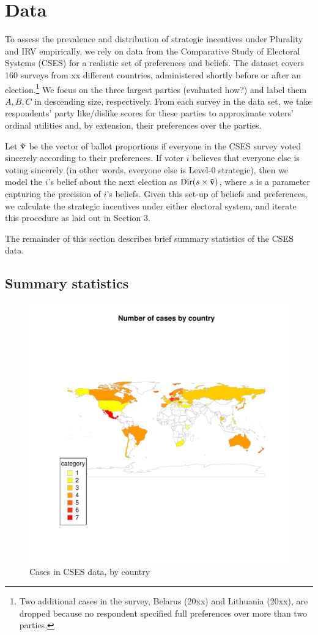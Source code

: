 \documentclass[11pt,a4paper]{article}
\begin{document}

\section{Data}

To assess the prevalence and distribution of strategic incentives under Plurality and IRV empirically, we rely on data from the  Comparative Study of Electoral Systems (CSES) for a realistic set of preferences and beliefs. The dataset covers 160 surveys from xx different countries, administered shortly before or after an election.\footnote{Two additional cases in the survey, Belarus (20xx) and Lithuania (20xx), are dropped because no respondent specified full preferences over more than two parties.} We focus on the three largest parties (evaluated how?) and label them $A, B, C$ in descending size, respectively. From each survey in the data set, we take respondents' party like/dislike scores for these parties to approximate voters' ordinal utilities and, by extension, their preferences over the parties.

Let $\bf \tilde{v}$ be the vector of ballot proportions if everyone in the CSES survey voted sincerely according to their preferences. If voter $i$ believes that everyone else is voting sincerely (in other words, everyone else is Level-0 strategic), then we model the $i$'s belief about the next election as $\text{Dir}(s \times \bf \tilde{v})$, where $s$ is a parameter capturing the precision of $i$'s beliefs. Given this set-up of beliefs and preferences, we calculate the strategic incentives under either electoral system, and iterate this procedure as laid out in Section 3.

The remainder of this section describes brief summary statistics of the CSES data.


\subsection{Summary statistics}

\begin{figure}[!htb]
	\centering
	\includegraphics[width = .5 \textwidth]{../../output/figures/case_map.pdf}
	\caption{Cases in CSES data, by country}
	\label{fig:case_map}
\end{figure}
\end{document}
